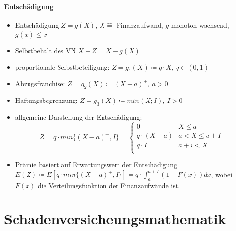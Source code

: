 \documentclass[12pt]{report}
\theoremstyle{dotless}
\theoremstyle{definition}
\begin{document}
\subsubsection{Entschädigung}
\begin{itemize}
	\item Entschädigung $Z=g(X)$, $X \hat{=}$ Finanzaufwand, $g$ monoton wachsend, $g(x) \leq x$
	\item Selbstbehalt des VN $X-Z=X-g(X)$
	\item proportionale Selbstbeteiligung: $Z=g_1(X) \coloneqq q \cdot X, \ q \in (0,1)$
	\item Abzugsfranchise: $Z=g_2(X) \coloneqq (X-a)^+, \ a>0$
	\item Haftungsbegrenzung: $Z=g_3(X) \coloneqq min(X;I), \ I>0$
	\item allgemeine Darstellung der Entschädigung:
		\begin{equation}
			Z=q \cdot min\{(X-a)^+,I\}= \begin{cases}
				0 & X \leq a \\
				q \cdot (X-a) & a<X \leq a+I \\
				q \cdot I & a+i < X \\
			\end{cases}
		\end{equation}
	\item Prämie basiert auf Erwartungswert der Entschädigung $E(Z) \coloneqq E[q \cdot min \{(X-a)^+,I\}]= q \cdot \int_a^{a+I}(1-F(x))dx$, wobei $F(x)$ die Verteilungsfunktion der Finanzaufwände ist.
\end{itemize}













\chapter{Schadenversicheungsmathematik}
\end{document}
